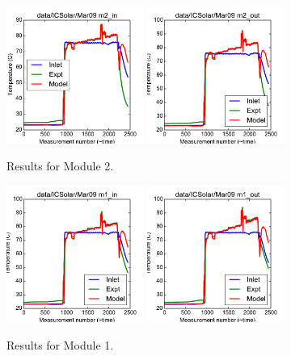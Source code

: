 \documentclass{article}
\begin{document}
\clearpage
\begin{figure}[!ht]
\centering
\includegraphics[width=0.4\textwidth]{../../data/ICSolar/images/Mar09_m2_in.pdf}\hspace{0.05\textwidth}
\includegraphics[width=0.4\textwidth]{../../data/ICSolar/images/Mar09_m2_out.pdf}\hspace{0.05\textwidth}\\
\caption{Results for Module 2.}\end{figure}
\begin{figure}[!ht]
\centering
\includegraphics[width=0.4\textwidth]{../../data/ICSolar/images/Mar09_m1_in.pdf}\hspace{0.05\textwidth}
\includegraphics[width=0.4\textwidth]{../../data/ICSolar/images/Mar09_m1_out.pdf}\hspace{0.05\textwidth}\\
\caption{Results for Module 1.}\end{figure}
\end{document}
